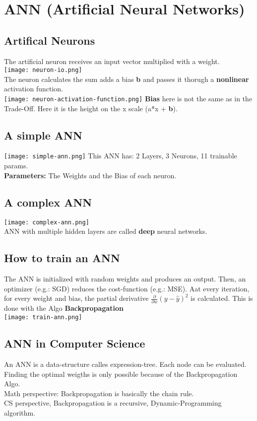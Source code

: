 \section{ANN (Artificial Neural Networks)}
\subsection{Artifical Neurons}
The artificial neuron receives an input vector multiplied with a weight.\\
\texttt{[image: neuron-io.png]}\\
The neuron calculates the sum adds a bias \textbf{b} and passes it thorugh a \textbf{nonlinear} activation function.\\
\texttt{[image: neuron-activation-function.png]}
\textbf{Bias} here is not the same as in the Trade-Off. Here it is the height on the x scale (a*x + \textbf{b}).

\subsection{A simple ANN}
\texttt{[image: simple-ann.png]}
This ANN has: 2 Layers, 3 Neurons, 11 trainable params.\\
\textbf{Parameters:} The Weights and the Bias of each neuron.

\subsection{A complex ANN}
\texttt{[image: complex-ann.png]}\\
ANN with multiple hidden layers are called \textbf{deep} neural networks.

\subsection{How to train an ANN}
The ANN is initialized with random weights and produces an output.
Then, an optimizer (e.g.: SGD) reduces the cost-function (e.g.: MSE).
Aat every iteration, for every weight and bias, the partial derivative $\frac{\partial}{\partial w}(y - \hat{y})^2$ is calculated.
This is done with the Algo \textbf{Backpropagation}\\
\texttt{[image: train-ann.png]}
\subsection{ANN in Computer Science}
An ANN is a data-structure calles expression-tree. 
Each node can be evaluated.
Finding the optimal weigths is only possible because of the Backpropagation Algo.\\
Math perspective: Backpropagation is basically the chain rule.\\
CS perspective, Backpropagation is a recursive, Dynamic-Programming algorithm.




